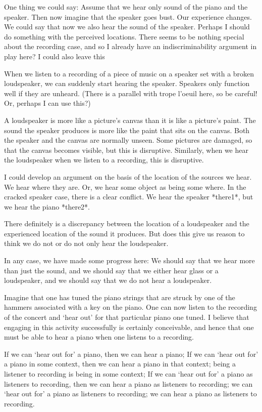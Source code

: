 \documentclass[sloppy, journal, git, bytitle, dodraft]{humapap}
\begin{document}
One thing we could say: Assume that we hear only sound of the piano and the speaker. Then now imagine that the speaker goes bust. Our experience changes. We could say that now we also hear the sound of the speaker. Perhaps I should do something with the perceived locations. There seems to be nothing special about the recording case, and so I already have an indiscriminability argument in play here? I could also leave this 

When we listen to a recording of a piece of music on a speaker set with a broken loudspeaker, we can suddenly start hearing the speaker. Speakers only function well if they are unheard. (There is a parallel with trope l'oeuil here, so be careful! Or, perhaps I can use this?) 

A loudspeaker is more like a picture's canvas than it is like a picture's paint. The sound the speaker produces is more like the paint that sits on the canvas. Both the speaker and the canvas are normally unseen. Some pictures are damaged, so that the canvas becomes visible, but this is disruptive. Similarly, when we hear the loudspeaker when we listen to a recording, this is disruptive. 

I could develop an argument on the basis of the location of the sources we hear. We hear where they are. Or, we hear some object as being some where. In the cracked speaker case, there is a clear conflict. We hear the speaker *there1*, but we hear the piano *there2*. 

There definitely is a discrepancy between the location of a loudspeaker and the experienced location of the sound it produces. But does this give us reason to think we do not or do not only hear the loudspeaker.
 

In any case, we have made some progress here: We should say that we hear more than just the sound, and we should say that we either hear glass or a loudspeaker, and we should say that we do not hear a loudspeaker. 


Imagine that one has tuned the piano strings that are struck by one of the hammers associated with a key on the piano. One can now listen to the recording of the concert and `hear out' for that particular piano one tuned. I believe that engaging in this activity successfully is certainly conceivable, and hence that one must be able to hear a piano when one listens to a recording. 
 
If we can `hear out for' a piano, then we can hear a piano; If we can `hear out for' a piano in some context, then we can hear a piano in that context; being a listener to recording is being in some context; If we can `hear out for' a piano as listeners to recording, then we can hear a piano as listeners to recording; we can `hear out for' a piano as listeners to recording; we can hear a piano as listeners to recording.
\end{document}
